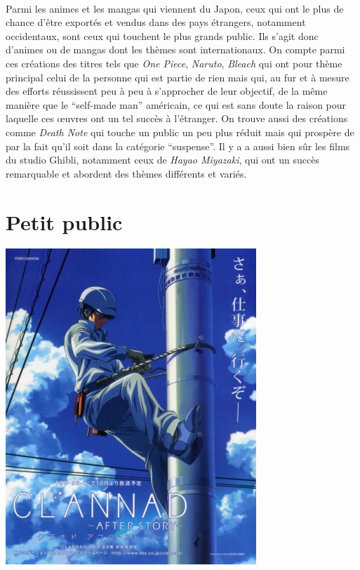 \paragraph{} Parmi les animes et les mangas qui viennent du Japon, ceux qui ont
le plus de chance d'être exportés et vendus dans des pays étrangers, notamment
occidentaux, sont ceux qui touchent le plus grands public. Ils s'agit donc
d'animes ou de mangas dont les thèmes sont internationaux. On compte parmi ces
créations des titres tels que \textit{One Piece}, \textit{Naruto},
\textit{Bleach} qui ont pour thème principal celui de la personne qui est
partie de rien mais qui, au fur et à mesure des efforts réussissent peu à peu à
s'approcher de leur objectif, de la même manière que le ``self-made man''
américain, ce qui est sans doute la raison pour laquelle ces œuvres ont un tel
succès à l'étranger. On trouve aussi des créations comme \textit{Death Note}
qui touche un public un peu plus réduit mais qui prospère de par la fait qu'il
soit dans la catégorie ``suspense''. Il y a a aussi bien sûr les films du
studio Ghibli, notamment ceux de \textit{Hayao Miyazaki}, qui ont un succès
remarquable et abordent des thèmes différents et variés.

\section{Petit public}

\begin{center}
	\includegraphics[scale=0.4]{Clannad.jpg}
\end{center}

